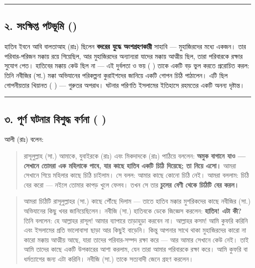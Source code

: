 \medskip\hrule\medskip

\subsection*{২. সংক্ষিপ্ত পটভূমি ()}

হাতিব ইবনে আবি বালতাআহ (রাঃ) ছিলেন \textbf{বদরের যুদ্ধে অংশগ্রহণকারী} সাহাবি — মুহাজিরদের মধ্যে একজন। তার পরিবার-পরিজন মক্কায় রয়ে গিয়েছিল, আর মুহাজিরদের অন্যান্যরা যাদের মক্কায় আত্মীয় ছিল, তারা পরিবারকে রক্ষার সুযোগ পেত। হাতিবের মক্কায় কেউ ছিল না — এই দুর্বলতা ও ভয় (  ) তাকে একটি বড় ভুল করতে প্ররোচিত করল: তিনি নবীজির (সা.) মক্কা অভিযানের পরিকল্পনা কুরাইশদের জানিয়ে একটি গোপন চিঠি পাঠালেন। এটি ছিল গোপনীয়তার খিয়ানত (  ) — গুরুতর অপরাধ। ঘটনার পরিণতি ইসলামের ইতিহাসে রহমতের একটি অনন্য দৃষ্টান্ত।

\medskip\hrule\medskip

\subsection*{৩. পূর্ণ ঘটনার বিশুদ্ধ বর্ণনা (  )}

আলী (রাঃ) বলেন:

\begin{quote}
রাসূলুল্লাহ (সা.) আমাকে, যুবাইরকে (রাঃ) এবং মিকদাদকে (রাঃ) পাঠিয়ে বললেন: \textbf{অমুক বাগানে যাও — সেখানে তোমরা এক মহিলাকে পাবে, যার কাছে হাতিব একটি চিঠি দিয়েছে; তা নিয়ে এসো।} আমরা সেখানে গিয়ে মহিলার কাছে চিঠি চাইলাম। সে বলল: আমার কাছে কোনো চিঠি নেই। আমরা বললাম: চিঠি বের করো — নইলে তোমার কাপড় খুলে ফেলব। তখন সে তার \textbf{চুলের বেণী থেকে চিঠিটি বের করল।}
\end{quote}

\begin{quote}
আমরা চিঠিটি রাসূলুল্লাহর (সা.) কাছে পৌঁছে দিলাম — তাতে হাতিব মক্কার মুশরিকদের কাছে নবীজির (সা.) অভিযানের কিছু খবর জানিয়েছিলেন। নবীজি (সা.) হাতিবকে ডেকে জিজ্ঞেস করলেন: \textbf{হাতিব! এটা কী?} তিনি বললেন: হে আল্লাহর রাসূল! আমার ব্যাপারে তাড়াহুড়া করবেন না। আল্লাহর কসম! আমি কুফরি করিনি এবং ইসলামের প্রতি ভালোবাসা ছাড়া আর কিছুই বাড়েনি। কিন্তু আপনার সাথে থাকা মুহাজিরদের কারো না কারো মক্কায় আত্মীয় আছে, যারা তাদের পরিবার-সম্পদ রক্ষা করে — আর আমার সেখানে কেউ নেই। তাই আমি তাদের কাছে একটি উপকারের আশা করলাম, যেন তারা আমার পরিবারকে রক্ষা করে। আমি কুফরি বা ধর্মত্যাগের জন্য এটা করিনি। নবীজি (সা.) তাকে সত্যবাদী জেনে গ্রহণ করলেন।
\end{quote}

